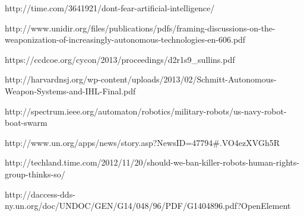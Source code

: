 http://time.com/3641921/dont-fear-artificial-intelligence/

http://www.unidir.org/files/publications/pdfs/framing-discussions-on-the-weaponization-of-increasingly-autonomous-technologies-en-606.pdf

https://ccdcoe.org/cycon/2013/proceedings/d2r1s9_sullins.pdf

http://harvardnsj.org/wp-content/uploads/2013/02/Schmitt-Autonomous-Weapon-Systems-and-IHL-Final.pdf

http://spectrum.ieee.org/automaton/robotics/military-robots/us-navy-robot-boat-swarm

http://www.un.org/apps/news/story.asp?NewsID=47794#.VO4ezXVGh5R 

http://techland.time.com/2012/11/20/should-we-ban-killer-robots-human-rights-group-thinks-so/

http://daccess-dds-ny.un.org/doc/UNDOC/GEN/G14/048/96/PDF/G1404896.pdf?OpenElement
